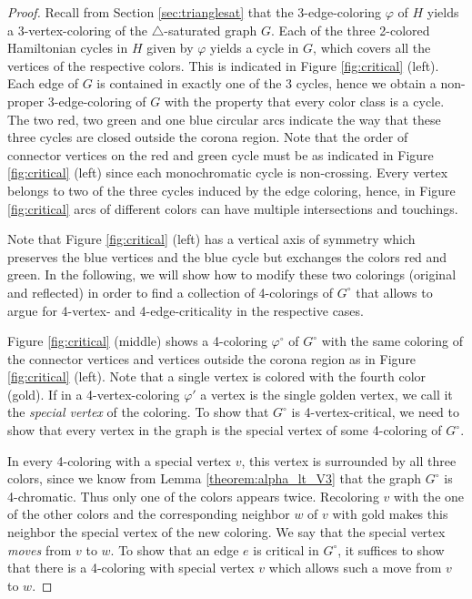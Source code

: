 \documentclass[fontsize=11pt,a4paper,DIV12]{scrartcl}
\def\GC{\ensuremath{G^\circ}}
\begin{document}
\begin{proof}
  Recall from Section \ref{sec:trianglesat} that the 3-edge-coloring $\varphi$ of $H$ yields a 3-vertex-coloring of the $\triangle$-saturated graph $G$. 
  Each of the three 2-colored Hamiltonian cycles in $H$ given by $\varphi$ yields a cycle in $G$, which covers all the vertices of the respective colors. This is indicated in Figure \ref{fig:critical} (left). 
  Each edge of $G$ is contained in exactly one of the 3 cycles, hence we obtain a non-proper 3-edge-coloring of $G$ with the property that every color class is a cycle. The two red, two green and one blue circular arcs indicate the way that these three cycles are closed outside the corona region. Note that the order of connector vertices on the red and green cycle must be as indicated in Figure \ref{fig:critical} (left) since each monochromatic cycle is non-crossing. 
  Every vertex belongs to two of the three cycles induced by the edge coloring, hence, in Figure \ref{fig:critical} arcs of different colors can have multiple intersections and touchings. 
  
  Note that Figure \ref{fig:critical} (left) has a vertical axis of symmetry which preserves the blue vertices and the blue cycle but exchanges the colors red and green. In the following, we will show how to modify these two colorings (original and reflected) in order to find a collection of 4-colorings of $\GC$ that allows to argue for 4-vertex- and 4-edge-criticality in the respective cases.
  
  
  Figure \ref{fig:critical} (middle) shows a 4-coloring $\varphi^\circ$ of $\GC$ with the same coloring of the connector vertices and vertices outside the corona region as in Figure \ref{fig:critical} (left). Note that a single vertex is colored with the fourth color (gold). If in a 4-vertex-coloring $\varphi'$ a vertex is the single golden vertex, we call it the \emph{special vertex} of the coloring. To show that $\GC$ is 4-vertex-critical, we need to show that every vertex in the graph is the special vertex of some 4-coloring of $\GC$. 
  
  In every 4-coloring with a special vertex $v$, this vertex is surrounded by all three colors, since we know from Lemma \ref{theorem:alpha_lt_V3} that the graph $\GC$ is 4-chromatic. Thus only one of the colors appears twice. Recoloring $v$ with the one of the other colors and the corresponding neighbor $w$ of $v$ with gold makes this neighbor the special vertex of the new coloring. We say that the special vertex \emph{moves} from $v$ to $w$. To show that an edge $e$ is critical in $\GC$, it suffices to show that there is a 4-coloring with special vertex $v$ which allows such a move from $v$ to $w$.
  

\end{proof}
\end{document}
